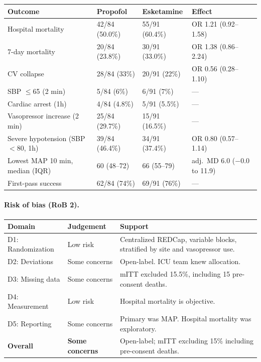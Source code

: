 \documentclass[11pt]{article}
\begin{document}
\begin{table}[H]
\centering\footnotesize
\begin{tabularx}{\textwidth}{L{4cm} C{2.5cm} C{2.5cm} X}
\toprule
\textbf{Outcome} & \textbf{Propofol} & \textbf{Esketamine} & \textbf{Effect} \\
\midrule
Hospital mortality & 42/84 (50.0\%) & 55/91 (60.4\%) & OR 1.21 (0.92--1.58) \\
7-day mortality & 20/84 (23.8\%) & 30/91 (33.0\%) & OR 1.38 (0.86--2.24) \\
CV collapse & 28/84 (33\%) & 20/91 (22\%) & OR 0.56 (0.28--1.10) \\
\quad SBP $\leq$65 (2 min) & 5/84 (6\%) & 6/91 (7\%) & --- \\
\quad Cardiac arrest (1h) & 4/84 (4.8\%) & 5/91 (5.5\%) & --- \\
\quad Vasopressor increase (2 min) & 25/84 (29.7\%) & 15/91 (16.5\%) & --- \\
Severe hypotension (SBP $<$80, 1h) & 39/84 (46.4\%) & 34/91 (37.4\%) & OR 0.80 (0.57--1.14) \\
Lowest MAP 10 min, median (IQR) & 60 (48--72) & 66 (55--79) & adj.\ MD 6.0 ($-$0.0 to 11.9) \\
First-pass success & 62/84 (74\%) & 69/91 (76\%) & --- \\
\bottomrule
\end{tabularx}
\end{table}

\paragraph{Risk of bias (RoB 2).}

\begin{table}[H]
\centering\footnotesize
\begin{tabularx}{\textwidth}{L{3cm} C{2cm} X}
\toprule
\textbf{Domain} & \textbf{Judgement} & \textbf{Support} \\
\midrule
D1: Randomization & Low risk & Centralized REDCap, variable blocks, stratified by site and vasopressor use. \\
D2: Deviations & Some concerns & Open-label. ICU team knew allocation. \\
D3: Missing data & Some concerns & mITT excluded 15.5\%, including 15 pre-consent deaths. \\
D4: Measurement & Low risk & Hospital mortality is objective. \\
D5: Reporting & Some concerns & Primary was MAP. Hospital mortality was exploratory. \\
\textbf{Overall} & \textbf{Some concerns} & Open-label; mITT excluding 15\% including pre-consent deaths. \\
\bottomrule
\end{tabularx}
\end{table}
\end{document}
